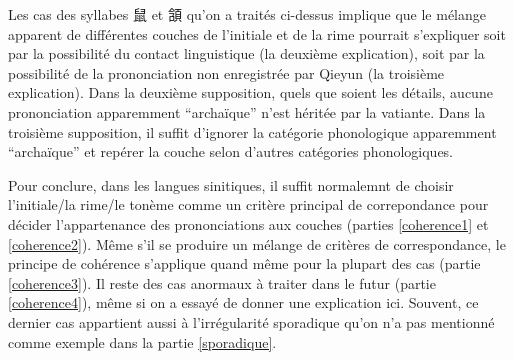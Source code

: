 \documentclass{scrbook}
\newcounter{c}[subsubsection]
\begin{document}
\begin{sloppypar}
Les cas des syllabes 鼠 et 頷 qu'on a traités ci-dessus implique que le mélange apparent de différentes couches de l'initiale et de la rime pourrait s'expliquer soit par la possibilité du contact linguistique (la deuxième explication), soit par la possibilité de la prononciation non enregistrée par Qieyun (la troisième explication). Dans la deuxième supposition, quels que soient les détails, aucune prononciation apparemment ``archaïque'' n'est héritée par la vatiante. Dans la troisième supposition, il suffit d'ignorer la catégorie phonologique apparemment ``archaïque'' et repérer la couche selon d'autres catégories phonologiques.

%

Pour conclure, dans les langues sinitiques, il suffit normalemnt de choisir l'initiale/la rime/le tonème comme un critère principal de correpondance pour décider l'appartenance des prononciations aux couches (parties \ref{coherence1} et \ref{coherence2}). Même s'il se produire un mélange de critères de correspondance, le principe de cohérence s'applique quand même pour la plupart des cas (partie \ref{coherence3}). Il reste des cas anormaux à traiter dans le futur (partie \ref{coherence4}), même si on a essayé de donner une explication ici. Souvent, ce dernier cas appartient aussi à l'irrégularité sporadique qu'on n'a pas mentionné comme exemple dans la partie \ref{sporadique}.


\end{sloppypar}
\end{document}
